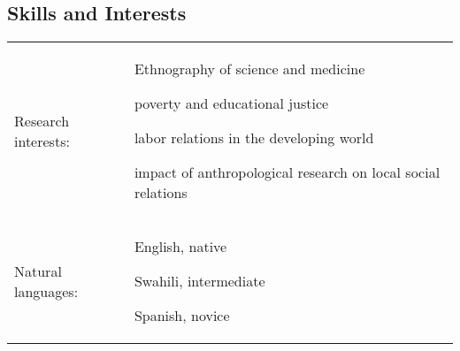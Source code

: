 \subsection{Skills and Interests}
\tabulinesep =0.9mm
\baselineskip
\begin{longtabu} to \linewidth{X[3]X[10]}
    Research interests: &
        \begin{itemize*}[itemjoin={{;\ }}, label=, afterlabel=,]
            \item Ethnography of science and medicine
            \item poverty and educational justice
            \item labor relations in the developing world
            \item impact of anthropological research on local social relations
        \end{itemize*}\\
    Natural languages: &
        \begin{itemize*}[itemjoin={{;\ }}, label=, afterlabel=,]
            \item English, native
            \item Swahili, intermediate
            \item Spanish, novice
        \end{itemize*}\\

\end{longtabu}
